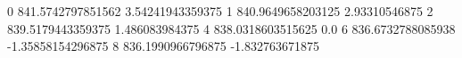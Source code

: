 0 841.5742797851562 3.54241943359375
1 840.9649658203125 2.93310546875
2 839.5179443359375 1.486083984375
4 838.0318603515625 0.0
6 836.6732788085938 -1.35858154296875
8 836.1990966796875 -1.832763671875
